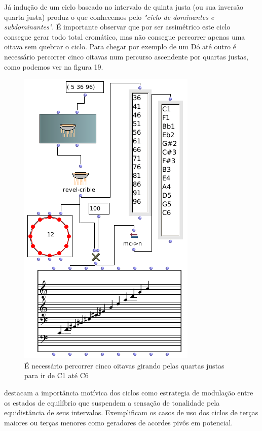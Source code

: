 \documentclass[
	12pt,				%
	openright,			%
	twoside,			%
	a4paper,			%
	english,			%
	french,				%
	spanish,			%
	brazil				%
	]{abntex2}
\begin{document}
Já indução de um ciclo baseado no intervalo de quinta justa (ou sua inversão quarta justa) produz o que conhecemos pelo \textit{"ciclo de dominantes e subdominantes"}. É importante observar que por ser assimétrico este ciclo consegue gerar todo total cromático, mas não consegue percorrer apenas uma oitava sem quebrar o ciclo. Para chegar por exemplo de um Dó até outro é necessário percorrer cinco oitavas num percurso ascendente por quartas justas, como podemos ver na figura 19.


\begin{figure}[!h]
	\caption{\label{fig_grafico}É necessário percorrer cinco oitavas girando pelas quartas justas para ir de C1 até C6  }
	\begin{center}
	    \includegraphics[scale=0.5]{ciclos/5JcrivosOM.png}
	\end{center}
\end{figure}

 destacam a importância motívica dos ciclos como estrategia de modulação entre os estados de equilíbrio que suspendem a sensação de tonalidade pela equidistância de seus intervalos. Exemplificam os casos de uso dos ciclos de terças maiores ou terças menores como geradores de acordes pivôs em potencial.
\end{document}
